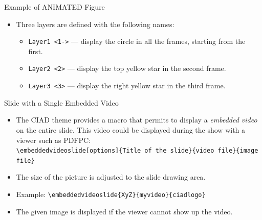 \documentclass[english,sectioncirclenumberstyle]{ciadbeamer}
\begin{document}
\begin{frame}{Example of ANIMATED Figure}
	\begin{itemize}
	\item Three layers are defined with the following names:
		\begin{itemize}
		\item \texttt{Layer1 <1->} --- display the circle in all the frames, starting from the first.
		\item \texttt{Layer2 <2>} --- display the top yellow star in the second frame.
		\item \texttt{Layer3 <3>} --- display the right yellow star in the third frame.
		\end{itemize}
	\end{itemize}
	\begin{center}
	\end{center}
\end{frame}

\begin{frame}[t]{Slide with a Single Embedded Video}
	\begin{itemize}
	\item The CIAD theme provides a macro that permits to display a \emph{embedded video} on the entire slide. This video could be displayed during the show with a viewer such as PDFPC: \\
		\texttt{{\textbackslash}embeddedvideoslide[options]\{Title of the slide\}\{video file\}\{image file\}}
	\item The size of the picture is adjusted to the slide drawing area.
	\item Example: \texttt{{\textbackslash}embeddedvideoslide\{XyZ\}\{myvideo\}\{ciadlogo\}} 
	\item The given image is displayed if the viewer cannot show up the video.
	\end{itemize}
\end{frame}
\end{document}
